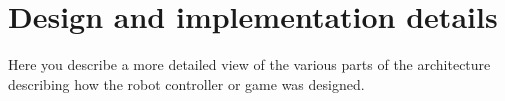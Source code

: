 \section{Design and implementation details}

Here you describe a more detailed view of the various parts of the architecture describing how the robot controller or game was designed.




